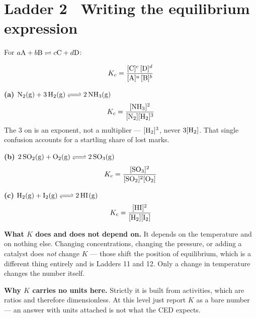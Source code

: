 \documentclass{apchem-worksheet}
\begin{document}
\section*{\sffamily Ladder 2 \textbullet\ Writing the equilibrium
expression}

For $a\ce{A} + b\ce{B} \rightleftharpoons c\ce{C} + d\ce{D}$:

\[ K_{c} = \frac{[\ce{C}]^{c}\,[\ce{D}]^{d}}
                {[\ce{A}]^{a}\,[\ce{B}]^{b}} \]

\begin{center}
\end{center}

\begin{workedexample}
\textbf{(a) $\ce{N2(g) + 3H2(g) <=> 2NH3(g)}$}
\[ K_{c} = \frac{[\ce{NH3}]^{2}}{[\ce{N2}][\ce{H2}]^{3}} \]
The 3 on  is an exponent, not a multiplier --- $[\ce{H2}]^{3}$,
never $3[\ce{H2}]$. That single confusion accounts for a startling share
of lost marks.

\textbf{(b) $\ce{2SO2(g) + O2(g) <=> 2SO3(g)}$}
\[ K_{c} = \frac{[\ce{SO3}]^{2}}{[\ce{SO2}]^{2}[\ce{O2}]} \]

\textbf{(c) $\ce{H2(g) + I2(g) <=> 2HI(g)}$}
\[ K_{c} = \frac{[\ce{HI}]^{2}}{[\ce{H2}][\ce{I2}]} \]

\textbf{What $K$ does and does not depend on.} It depends on the
temperature and on nothing else. Changing concentrations, changing the
pressure, or adding a catalyst does \emph{not} change $K$ --- those
shift the position of equilibrium, which is a different thing entirely
and is Ladders 11 and 12. Only a change in temperature changes the
number itself.

\textbf{Why $K$ carries no units here.} Strictly it is built from
activities, which are ratios and therefore dimensionless. At this level
just report $K$ as a bare number --- an answer with units attached is
not what the CED expects.
\end{workedexample}
\end{document}
